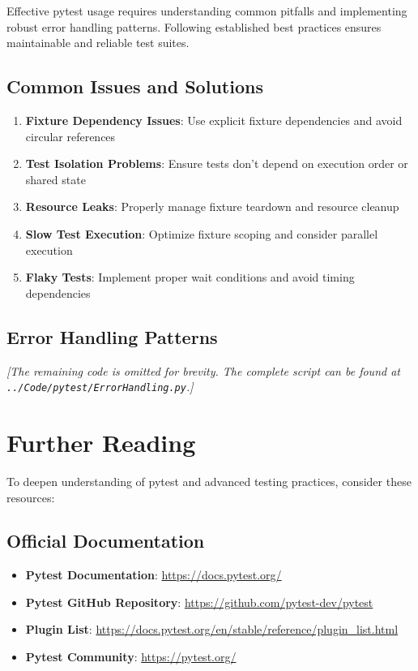 Effective pytest usage requires understanding common pitfalls and implementing robust error handling patterns. Following established best practices ensures maintainable and reliable test suites.

\subsection{Common Issues and Solutions}
\label{subsec:common_issues}

\begin{enumerate}
	\item \textbf{Fixture Dependency Issues}: Use explicit fixture dependencies and avoid circular references
	\item \textbf{Test Isolation Problems}: Ensure tests don't depend on execution order or shared state
	\item \textbf{Resource Leaks}: Properly manage fixture teardown and resource cleanup
	\item \textbf{Slow Test Execution}: Optimize fixture scoping and consider parallel execution
	\item \textbf{Flaky Tests}: Implement proper wait conditions and avoid timing dependencies
\end{enumerate}

\subsection{Error Handling Patterns}
\label{subsec:error_patterns}



\noindent\textit{[The remaining code is omitted for brevity. The complete script can be found at \texttt{../Code/pytest/ErrorHandling.py}.]}

\section{Further Reading}
\label{sec:further_reading}

To deepen understanding of pytest and advanced testing practices, consider these resources:

\subsection{Official Documentation}
\begin{itemize}
	\item \textbf{Pytest Documentation}: \url{https://docs.pytest.org/}
	\item \textbf{Pytest GitHub Repository}: \url{https://github.com/pytest-dev/pytest} \cite{Pytest:2024}
	\item \textbf{Plugin List}: \url{https://docs.pytest.org/en/stable/reference/plugin_list.html}
	\item \textbf{Pytest Community}: \url{https://pytest.org/}
\end{itemize}

